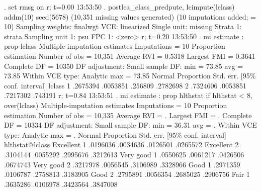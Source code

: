 . set rmsg on
r; t=0.00 13:53:50
{\smallskip}
. postlca_class_predpute, lcimpute(lclass) addm(10) seed(5678)
(10,351 missing values generated)
(10 imputations added; {} = 10)
{\smallskip}
Sampling weights: finalwgt
             VCE: linearized
     Single unit: missing
        Strata 1: strata
 Sampling unit 1: psu
           FPC 1: <zero>
r; t=0.20 13:53:50
{\smallskip}
. mi estimate : prop lclass
{\smallskip}
Multiple-imputation estimates     Imputations     =         10
Proportion estimation             Number of obs   =     10,351
                                  Average RVI     =     0.5318
                                  Largest FMI     =     0.3641
                                  Complete DF     =      10350
DF adjustment:   Small sample     DF:     min     =      73.85
                                          avg     =      73.85
Within VCE type:     Analytic             max     =      73.85
{\smallskip}
             {\VBAR}                                   Normal
             {\VBAR} Proportion   Std. err.     [95\% conf. interval]
      lclass {\VBAR}
          1  {\VBAR}   .2675394   .0053851       .256809    .2782698
          2  {\VBAR}   .7324606   .0053851      .7217302     .743191
r; t=0.84 13:53:51
{\smallskip}
. mi estimate : prop hlthstat if hlthstat < 8, over(lclass)
{\smallskip}
Multiple-imputation estimates     Imputations     =         10
Proportion estimation             Number of obs   =     10,335
                                  Average RVI     =          .
                                  Largest FMI     =          .
                                  Complete DF     =      10334
DF adjustment:   Small sample     DF:     min     =      36.31
                                          avg     =          .
Within VCE type:     Analytic             max     =          .
{\smallskip}
                {\VBAR}                                   Normal
                {\VBAR} Proportion   Std. err.     [95\% conf. interval]
hlthstat@lclass {\VBAR}
   Excellent 1  {\VBAR}   .0196036   .0034636      .0126501    .0265572
   Excellent 2  {\VBAR}   .3104144   .0055292      .2995676    .3212613
   Very good 1  {\VBAR}   .0550625   .0061217      .0426506    .0674743
   Very good 2  {\VBAR}   .3217978   .0056545      .3106989    .3328966
        Good 1  {\VBAR}   .2971359   .0106787      .2758813    .3183905
        Good 2  {\VBAR}   .2795891   .0056354      .2685025    .2906756
        Fair 1  {\VBAR}   .3635286   .0106978      .3423564    .3847008

